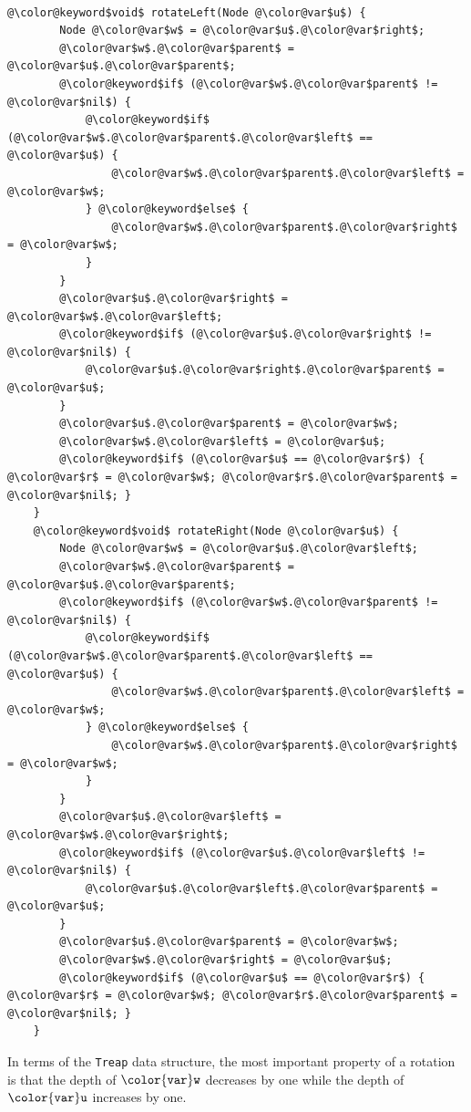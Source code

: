 \documentclass[10pt]{book}
\theoremstyle{plain}
\theoremstyle{definition}
\begin{document}
 \ \vspace{.5ex}\begin{Verbatim}[gobble=1,tabsize=2,frame=single,framerule=1.2pt,commandchars=\\@\$,label=\texttt{BinarySearchTree},labelposition=topline]
	@\color@keyword$void$ rotateLeft(Node @\color@var$u$) {
		Node @\color@var$w$ = @\color@var$u$.@\color@var$right$;
		@\color@var$w$.@\color@var$parent$ = @\color@var$u$.@\color@var$parent$;
		@\color@keyword$if$ (@\color@var$w$.@\color@var$parent$ != @\color@var$nil$) {
			@\color@keyword$if$ (@\color@var$w$.@\color@var$parent$.@\color@var$left$ == @\color@var$u$) {
				@\color@var$w$.@\color@var$parent$.@\color@var$left$ = @\color@var$w$;
			} @\color@keyword$else$ {
				@\color@var$w$.@\color@var$parent$.@\color@var$right$ = @\color@var$w$;
			}
		}
		@\color@var$u$.@\color@var$right$ = @\color@var$w$.@\color@var$left$;
		@\color@keyword$if$ (@\color@var$u$.@\color@var$right$ != @\color@var$nil$) {
			@\color@var$u$.@\color@var$right$.@\color@var$parent$ = @\color@var$u$;
		}
		@\color@var$u$.@\color@var$parent$ = @\color@var$w$;
		@\color@var$w$.@\color@var$left$ = @\color@var$u$;
		@\color@keyword$if$ (@\color@var$u$ == @\color@var$r$) { @\color@var$r$ = @\color@var$w$; @\color@var$r$.@\color@var$parent$ = @\color@var$nil$; }
	}	
	@\color@keyword$void$ rotateRight(Node @\color@var$u$) {
		Node @\color@var$w$ = @\color@var$u$.@\color@var$left$;
		@\color@var$w$.@\color@var$parent$ = @\color@var$u$.@\color@var$parent$;
		@\color@keyword$if$ (@\color@var$w$.@\color@var$parent$ != @\color@var$nil$) {
			@\color@keyword$if$ (@\color@var$w$.@\color@var$parent$.@\color@var$left$ == @\color@var$u$) {
				@\color@var$w$.@\color@var$parent$.@\color@var$left$ = @\color@var$w$;
			} @\color@keyword$else$ {
				@\color@var$w$.@\color@var$parent$.@\color@var$right$ = @\color@var$w$;
			}
		}
		@\color@var$u$.@\color@var$left$ = @\color@var$w$.@\color@var$right$;
		@\color@keyword$if$ (@\color@var$u$.@\color@var$left$ != @\color@var$nil$) {
			@\color@var$u$.@\color@var$left$.@\color@var$parent$ = @\color@var$u$;
		}
		@\color@var$u$.@\color@var$parent$ = @\color@var$w$;
		@\color@var$w$.@\color@var$right$ = @\color@var$u$;
		@\color@keyword$if$ (@\color@var$u$ == @\color@var$r$) { @\color@var$r$ = @\color@var$w$; @\color@var$r$.@\color@var$parent$ = @\color@var$nil$; }
	}
\end{Verbatim}

\label{page:rotations}
In terms of the \texttt{Treap} data structure, the most important property of a
rotation is that the depth of \ensuremath{\mathtt{{\color{var}w}}} decreases by one while the depth of \ensuremath{\mathtt{{\color{var}u}}}
increases by one.
\end{document}
